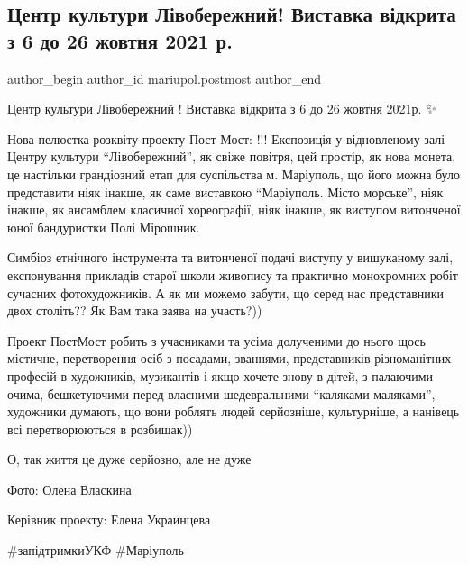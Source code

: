  
 
 
 
 

\subsection{Центр культури Лівобережний! Виставка відкрита з 6 до 26 жовтня 2021 р.}
\label{sec:11_10_2021.fb.mariupol.postmost.1.tsentr_kulturi_l_vob}

\ifcmt
 author_begin
   author_id mariupol.postmost
 author_end
\fi

Центр культури Лівобережний ! Виставка відкрита з 6 до 26 жовтня 2021р. ✨ 

Нова пелюстка розквіту проекту Пост Мост: !!! Експозиція у відновленому залі
Центру культури \enquote{Лівобережний}, як свіже повітря, цей простір, як нова монета,
це настільки грандіозний етап для суспільства м. Маріуполь, що його можна було
представити ніяк інакше, як саме виставкою \enquote{Маріуполь. Місто морське}, ніяк
інакше, як ансамблем класичної хореографії, ніяк інакше, як виступом витонченої
юної бандуристки Полі Мірошник. 

Симбіоз етнічного інструмента та витонченої подачі виступу у вишуканому залі,
експонування прикладів старої школи живопису та практично монохромних робіт
сучасних фотохудожників. А як ми можемо забути, що серед нас представники двох
століть?? Як Вам така заява на участь?)) 

Проект ПостМост робить з учасниками та усіма долученими до нього щось містичне,
перетворення осіб з посадами, званнями, представників різноманітних професій в
художників, музикантів і якщо хочете знову в дітей, з палаючими очима,
бешкетуючими перед власними шедевральними \enquote{каляками маляками}, художники
думають, що вони роблять людей серйозніше, культурніше, а нанівець всі
перетворюються в розбишак))

О, так життя це дуже серйозно, але не дуже🤫

Фото: Олена Власкина

Керівник проекту: Елена Украинцева

\#запідтримкиУКФ \#Маріуполь
